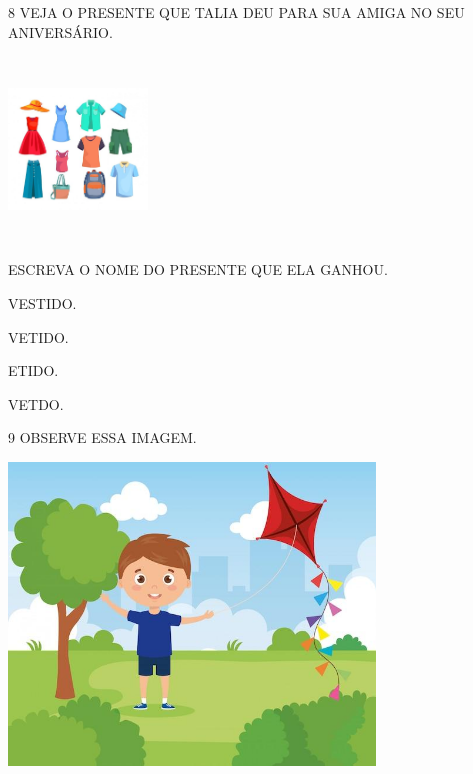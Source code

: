 \num{8} VEJA O PRESENTE QUE TALIA DEU PARA SUA AMIGA NO SEU ANIVERSÁRIO.

\includegraphics[width=1.45972in,height=1.93403in]{media/image232.jpg}


ESCREVA O NOME DO PRESENTE QUE ELA GANHOU.

\begin{escolha}
\item VESTIDO.

\item VETIDO.

\item ETIDO.

\item VETDO.
\end{escolha}

\num{9} OBSERVE ESSA IMAGEM.

\includegraphics[width=3.84043in,height=3.16853in]{media/image233.jpg}


